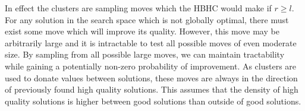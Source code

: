 \documentclass{sig-alternate}
\newcommand{\BigO}[1]{$\mathcal{O}{(#1)}$}
\begin{document}
In effect the clusters are sampling moves which the HBHC
would make if $r \ge l$. For any solution in the search space which is not globally optimal, there
must exist some move which will improve its quality. However, this move may
be arbitrarily large and it is intractable to test all possible moves of even moderate size.
By sampling from all possible large moves, we can maintain tractability while gaining
a potentially non-zero probability of improvement.
As clusters are used to donate values between solutions, these
moves are always in the direction of previously found high quality solutions.
This assumes that the density of high quality solutions is higher between good solutions than
outside of good solutions.

\begin{comment}
Figure~\ref{fig-sfx-tree} provides an efficient method for creating a linkage
tree similar to that used in Black-Box P3 given subfunction information.
Each variable starts in its own cluster. Each subfunction in a random order
is used to determine how to link existing clusters. If a subfunction overlaps
multiple top level clusters, all overlapped clusters are merged to create a new
top level cluster. This process creates a linkage tree similar to that learned
for P3, with the difference that a node in the tree can have up to $k$ children.

\Call{SubfunctionTree}{} requires \BigO{|cluster|} time to construct each $cluster$
in the linkage tree. In the gray-box domain the total number of subfunctions is required
to be $\Theta(N)$ in order to ensure the problem is not separable. As all variables must
participate in a subfunction, $\Theta(N)$ clusters must be created. Therefore
the only cost which cannot be amortized over the clusters to \BigO{1} is the creation
of each new $cluster$, leading to a time of \BigO{|cluster|} per $cluster$.

This method of constructing clusters has a number of desirable properties beyond its
efficiency. As all non-linear relationships are denoted by subfunctions, mixing
complete subfunctions between individuals has a high likelihood of preserving quality.
Each cluster contains at least one entire subfunction, and two
clusters must differ by at least one entire subfunction. The probability two
variables appear in the same cluster increases with the number of subfunctions
they share. The more paths that exist between two variables in the subfunction
connectivity graph, the more likely those variables will appear in the same cluster.
\end{comment}
\end{document}
